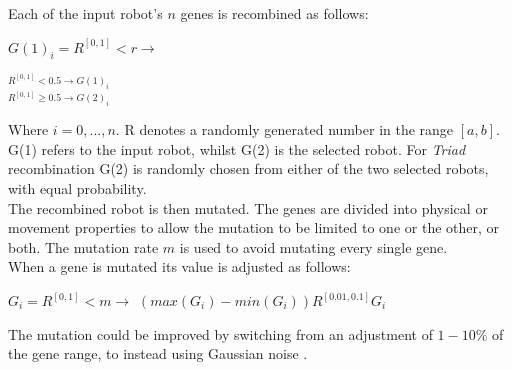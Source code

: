 \documentclass{article}
\begin{document}
Each of the input robot's $n$ genes is recombined as follows:
\begin{center}
\begin{Large}
$G(1)_{i} = R^{[0, 1]} < r \longrightarrow$ 
\begin{LARGE}
$^{R^{[0, 1]} < 0.5\longrightarrow G(1)_{i}} 
_{R^{[0, 1]} \geq 0.5 \longrightarrow G(2)_{i}}$
\end{LARGE}
\end{Large}
\end{center}

\noindent Where $i = 0, ..., n$. R denotes a randomly generated number in the range $[a, b]$. G(1) refers to the input robot, whilst G(2) is the selected robot. For \textit{Triad} recombination G(2) is randomly chosen from either of the two selected robots, with equal probability.\\

The recombined robot is then mutated. The genes are divided into physical or movement properties to allow the mutation to be limited to one or the other, or both.
The mutation rate $m$ is used to avoid mutating every single gene.\\
When a gene is mutated its value is adjusted as follows:
\begin{center}
\begin{Large}
$G_{i} = R^{[0, 1]} < m \longrightarrow $
$(max(G_{i}) - min(G_{i})) R^{[0.01, 0.1]}  G_{i}$\\[1\baselineskip]
\end{Large}
\end{center}
The mutation could be improved by switching from an adjustment of $1-10\%$ of the gene range, to instead using Gaussian noise .\\
\end{document}
